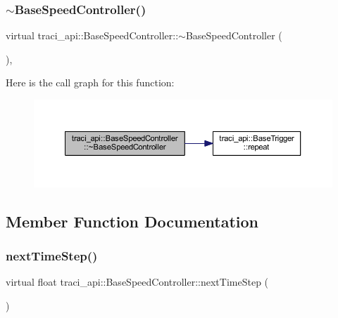 \subsubsection{\texorpdfstring{$\sim$\+Base\+Speed\+Controller()}{~BaseSpeedController()}}
{\footnotesize\ttfamily virtual traci\+\_\+api\+::\+Base\+Speed\+Controller\+::$\sim$\+Base\+Speed\+Controller (\begin{DoxyParamCaption}{ }\end{DoxyParamCaption})\hspace{0.3cm}{\ttfamily [inline]}, {\ttfamily [virtual]}}

Here is the call graph for this function\+:\nopagebreak
\begin{figure}[H]
\begin{center}
\leavevmode
\includegraphics[width=350pt]{classtraci__api_1_1_base_speed_controller_a7cabfad7b110f2463c62fe9e1d882043_cgraph}
\end{center}
\end{figure}


\subsection{Member Function Documentation}
\mbox{\label{classtraci__api_1_1_base_speed_controller_ab9658ce36f91de8a34bb710b3241c210}} 
\subsubsection{\texorpdfstring{next\+Time\+Step()}{nextTimeStep()}}
{\footnotesize\ttfamily virtual float traci\+\_\+api\+::\+Base\+Speed\+Controller\+::next\+Time\+Step (\begin{DoxyParamCaption}{ }\end{DoxyParamCaption})\hspace{0.3cm}{\ttfamily [pure virtual]}}



